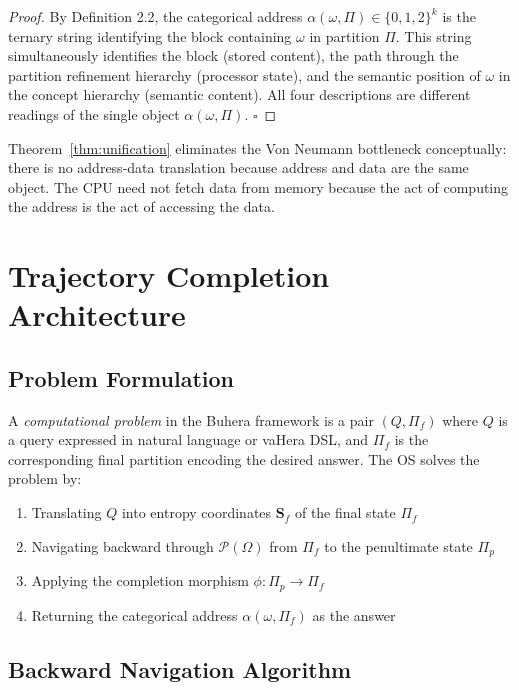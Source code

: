 \documentclass[12pt,twocolumn]{article}
\begin{document}
\begin{proof}
By Definition 2.2, the categorical address $\alpha(\omega, \Pi) \in \{0,1,2\}^k$ is the ternary string identifying the block containing $\omega$ in partition $\Pi$. This string simultaneously identifies the block (stored content), the path through the partition refinement hierarchy (processor state), and the semantic position of $\omega$ in the concept hierarchy (semantic content). All four descriptions are different readings of the single object $\alpha(\omega, \Pi)$. $\square$
\end{proof}

Theorem~\ref{thm:unification} eliminates the Von Neumann bottleneck conceptually: there is no address-data translation because address and data are the same object. The CPU need not fetch data from memory because the act of computing the address is the act of accessing the data.

\section{Trajectory Completion Architecture}
\label{sec:trajectory}

\subsection{Problem Formulation}

A \emph{computational problem} in the Buhera framework is a pair $(Q, \Pi_f)$ where $Q$ is a query expressed in natural language or vaHera DSL, and $\Pi_f$ is the corresponding final partition encoding the desired answer. The OS solves the problem by:

\begin{enumerate}
\item Translating $Q$ into entropy coordinates $\mathbf{S}_f$ of the final state $\Pi_f$
\item Navigating backward through $\mathcal{P}(\Omega)$ from $\Pi_f$ to the penultimate state $\Pi_p$
\item Applying the completion morphism $\phi: \Pi_p \to \Pi_f$
\item Returning the categorical address $\alpha(\omega, \Pi_f)$ as the answer
\end{enumerate}

\subsection{Backward Navigation Algorithm}
\end{document}
